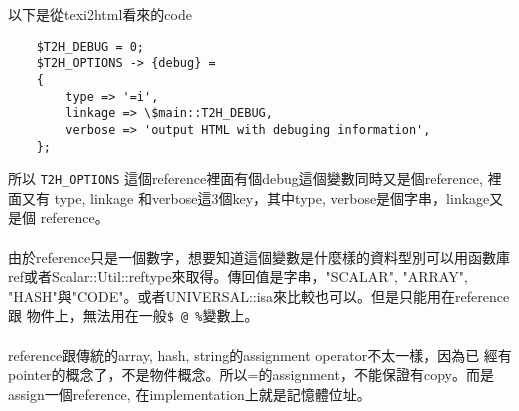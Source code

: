     以下是從texi2html看來的code
    \begin{verbatim}
    $T2H_DEBUG = 0;
    $T2H_OPTIONS -> {debug} =
    {
        type => '=i',
        linkage => \$main::T2H_DEBUG,
        verbose => 'output HTML with debuging information',
    };
    \end{verbatim}
    所以
    \verb=T2H_OPTIONS=
    這個reference裡面有個debug這個變數同時又是個reference, 裡面又有
    type, linkage 和verbose這3個key，其中type, verbose是個字串，linkage又是個
    reference。
    \\\\
    由於reference只是一個數字，想要知道這個變數是什麼樣的資料型別可以用函數庫
    ref或者Scalar::Util::reftype來取得。傳回值是字串，"SCALAR", "ARRAY", 
    "HASH"與"CODE"。或者UNIVERSAL::isa來比較也可以。但是只能用在reference跟
    物件上，無法用在一般\verb=$ @ %=變數上。
    \\\\
    reference跟傳統的array, hash, string的assignment operator不太一樣，因為已
    經有pointer的概念了，不是物件概念。所以=的assignment，不能保證有copy。而是
    assign一個reference, 在implementation上就是記憶體位址。

